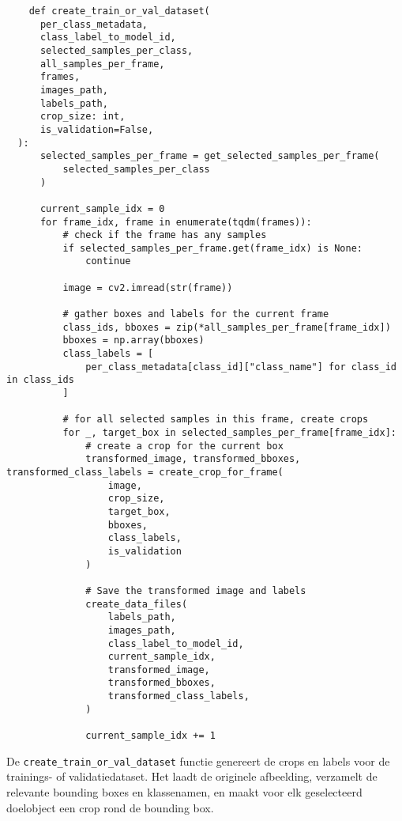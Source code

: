 \begin{listing}[H]
  \fontsize{11pt}{9.6pt}
  \begin{verbatim}
    def create_train_or_val_dataset(
      per_class_metadata,
      class_label_to_model_id,
      selected_samples_per_class,
      all_samples_per_frame,
      frames,
      images_path,
      labels_path,
      crop_size: int,
      is_validation=False,
  ):
      selected_samples_per_frame = get_selected_samples_per_frame(
          selected_samples_per_class
      )

      current_sample_idx = 0
      for frame_idx, frame in enumerate(tqdm(frames)):
          # check if the frame has any samples
          if selected_samples_per_frame.get(frame_idx) is None:
              continue

          image = cv2.imread(str(frame))

          # gather boxes and labels for the current frame
          class_ids, bboxes = zip(*all_samples_per_frame[frame_idx])
          bboxes = np.array(bboxes)
          class_labels = [
              per_class_metadata[class_id]["class_name"] for class_id in class_ids
          ]

          # for all selected samples in this frame, create crops
          for _, target_box in selected_samples_per_frame[frame_idx]:
              # create a crop for the current box
              transformed_image, transformed_bboxes, transformed_class_labels = create_crop_for_frame(
                  image,
                  crop_size,
                  target_box,
                  bboxes,
                  class_labels,
                  is_validation
              )

              # Save the transformed image and labels
              create_data_files(
                  labels_path,
                  images_path,
                  class_label_to_model_id,
                  current_sample_idx,
                  transformed_image,
                  transformed_bboxes,
                  transformed_class_labels,
              )

              current_sample_idx += 1
  \end{verbatim}
  \caption[Functie voor het creëren van de trainings- en validatiedatasets]{
    \label{listing:create-train-val-dataset}
    De \texttt{create\_train\_or\_val\_dataset} functie genereert de crops en labels voor de trainings- of validatiedataset.
    Het laadt de originele afbeelding, verzamelt de relevante bounding boxes en klassenamen,
    en maakt voor elk geselecteerd doelobject een crop rond de bounding box.
    }
\end{listing}

